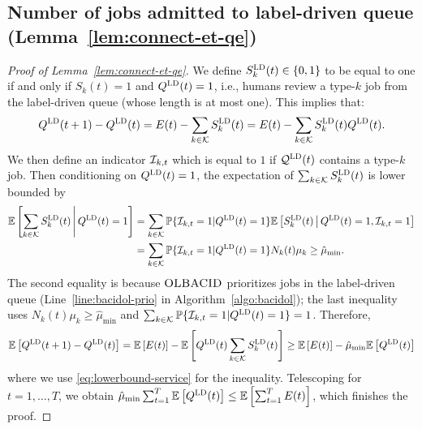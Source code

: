 \subsection{Number of jobs admitted to label-driven queue (Lemma~\ref{lem:connect-et-qe})}\label{app:lem-connect-et-qe}
\begin{proof}[Proof of Lemma~\ref{lem:connect-et-qe}]
We define $S^{\mathcal{\textsc{LD}}}_k(t) \in \{0,1\}$ to be equal to one if and only if $S_k(t) = 1$ and $Q^{\mathcal{\textsc{LD}}}(t) = 1$, i.e., humans review a type-$k$ job from the label-driven queue (whose length is at most one). This implies that:
$$Q^{\mathcal{\textsc{LD}}}(t+1) - Q^{\mathcal{\textsc{LD}}}(t) = E(t) - \sum_{k \in \mathcal{K}}  S_k^{\mathcal{\textsc{LD}}}(t) = E(t) - \sum_{k \in \mathcal{K}} S_k^{\mathcal{\textsc{LD}}}(t)Q^{\mathcal{\textsc{LD}}}(t).$$ We then define an indicator $\mathcal{I}_{k,t}$ which is equal to $1$ if $\mathcal{Q}^{\mathcal{\textsc{LD}}}(t)$ contains a type-$k$ job. Then conditioning on $Q^{\mathcal{\textsc{LD}}}(t) = 1$, the expectation of $\sum_{k \in \mathcal{K}}S_k^{\mathcal{\textsc{LD}}}(t)$ is lower bounded by
\begin{align}
\mathbb E\left[\sum_{k \in \mathcal{K}} S_k^{\mathcal{\textsc{LD}}}(t) \,\middle\vert\, Q^{\mathcal{\textsc{LD}}}(t) = 1\right] &= \sum_{k \in \mathcal{K}} \mathbb{P}\{\mathcal{I}_{k,t} = 1 | Q^{\mathcal{\textsc{LD}}}(t) = 1\}\mathbb E\left[S_k^{\mathcal{\textsc{LD}}}(t) \,\middle\vert\, Q^{\mathcal{\textsc{LD}}}(t) = 1, \mathcal{I}_{k,t} = 1\right] \nonumber\\
&= \sum_{k \in \mathcal{K}} \mathbb{P}\{\mathcal{I}_{k,t} = 1 | Q^{\mathcal{\textsc{LD}}}(t) = 1\}N_k(t)\mu_k \geq \hat{\mu}_{\min}.\label{eq:lowerbound-service}
\end{align}
The second equality is because $\textsc{OLBACID}$ prioritizes jobs in the label-driven queue (Line~\ref{line:bacidol-prio} in Algorithm~\ref{algo:bacidol}); the last inequality uses $N_k(t)\mu_k \geq \hat{\mu}_{\min}$ and $\sum_{k \in \mathcal{K}} \mathbb{P}\{\mathcal{I}_{k,t} = 1 | Q^{\mathcal{\textsc{LD}}}(t) = 1\} = 1$. Therefore,
\[
\mathbb E\left[Q^{\mathcal{\textsc{LD}}}(t+1) - Q^{\mathcal{\textsc{LD}}}(t)\right] = \mathbb E\left[E(t)\right] - \mathbb E\left[Q^{\mathcal{\textsc{LD}}}(t)\sum_{k \in \mathcal{K}} S_k^{\mathcal{\textsc{LD}}}(t)\right] \geq \mathbb E\left[E(t)\right] - \hat{\mu}_{\min}\mathbb E\left[Q^{\mathcal{\textsc{LD}}}(t)\right]
\]
where we use \eqref{eq:lowerbound-service} for the inequality. Telescoping for $t = 1,\ldots,T$, we obtain $\hat{\mu}_{\min}\sum_{t=1}^T \mathbb E\left[Q^{\mathcal{\textsc{LD}}}(t)\right] \leq \mathbb E\left[\sum_{t=1}^T E(t)\right]$, which finishes the proof.
\end{proof}


